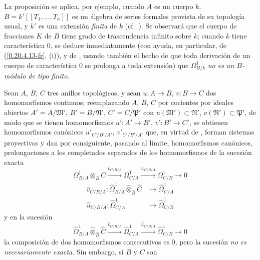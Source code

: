 \begin{env}[20.7.16]
\label{0.20.7.16-fr}
La proposición  se aplica, por ejemplo, cuando $A$ es un
cuerpo $k$, $B=k'[[T_1,\ldots,T_n]]$ es un álgebra de series formales provista de
su topología usual, y $k'$ es una extensión \emph{finita} de $k$ (cf.\
). Se observará que el cuerpo de fracciones $K$ de $B$ tiene
grado de trascendencia infinito sobre $k$; cuando $k$ tiene característica
$0$, se deduce inmediatamente (con ayuda, en particular, de
(\ref{0.20.4.13-fr}, (i)), y de , usando también el hecho de
que toda derivación de un cuerpo de característica $0$ se prolonga a toda
extensión) que $\Omega^1_{B/k}$ \emph{no es un $B$-módulo de tipo finito}.
\end{env}

\begin{env}[20.7.17]
\label{0.20.7.17-fr}
Sean $A$, $B$, $C$ tres anillos topológicos, y sean $u:A\to B$, $v:B\to C$
dos homomorfismos continuos; reemplazando $A$, $B$, $C$ por cocientes por
ideales abiertos $A'=A/\mathfrak{M}'$, $B'=B/\mathfrak{N}'$,
$C'=C/\mathfrak{P}'$ con $u(\mathfrak{M}')\subset\mathfrak{N}'$,
$v(\mathfrak{N}')\subset\mathfrak{P}'$, de modo que se tienen homomorfismos
$u':A'\to B'$, $v':B'\to C'$, se obtienen homomorfismos canónicos
$u'_{C'/B'/A'}$, $v'_{C'/B'/A'}$ que, en virtud de
, forman sistemas proyectivos y dan por consiguiente,
pasando al límite, homomorfismos canónicos, prolongaciones a los completados
separados de los homomorfismos de la sucesión exacta
\[
  \Omega^1_{B/A}\otimes_B C\xrightarrow{v_{C/B/A}}\Omega^1_{C/A}
  \xrightarrow{u_{C/B/A}}\Omega^1_{C/B}\to0
\]
\begin{align}
  \widehat v_{C/B/A}:\widehat{\Omega}^1_{B/A}
  \widehat\otimes_{\widehat B}\widehat C&\to\widehat{\Omega}^1_{C/A}
  \tag{20.7.17.1}\label{0.20.7.17.1-fr}\\
  \widehat u_{C/B/A}:\widehat{\Omega}^1_{C/A}&\to
  \widehat{\Omega}^1_{C/B} \tag{20.7.17.2}\label{0.20.7.17.2-fr}
\end{align}
y en la sucesión
\begin{equation}
\tag{20.7.17.3}
\label{0.20.7.17.3-fr}
  \widehat{\Omega}^1_{B/A}\widehat\otimes_{\widehat B}\widehat C
  \xrightarrow{\widehat v_{C/B/A}}\widehat{\Omega}^1_{C/A}
  \xrightarrow{\widehat u_{C/B/A}}\widehat{\Omega}^1_{C/B}\to0
\end{equation}
la composición de dos homomorfismos consecutivos es $0$, pero la sucesión
\emph{no es necesariamente exacta}. Sin embargo, si $B$ y $C$ son

\end{env}
